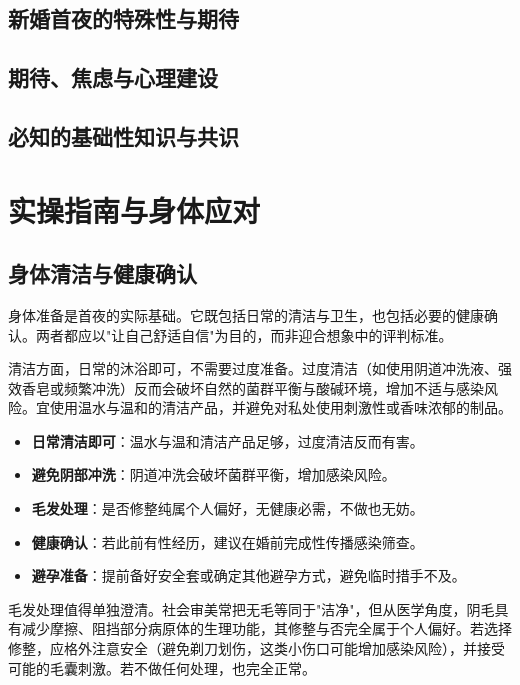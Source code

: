 \documentclass[12pt,UTF8]{ctexbook}
\newcommand{\keyword}[1]{\textbf{#1}}
\begin{document}
\subsection{新婚首夜的特殊性与期待}

\subsection{期待、焦虑与心理建设}

\subsection{必知的基础性知识与共识}




\section{实操指南与身体应对}


\subsection{身体清洁与健康确认}

身体准备是首夜的实际基础。它既包括日常的清洁与卫生，也包括必要的健康确认。两者都应以"让自己舒适自信"为目的，而非迎合想象中的评判标准。

清洁方面，日常的沐浴即可，不需要过度准备。过度清洁（如使用阴道冲洗液、强效香皂或频繁冲洗）反而会破坏自然的菌群平衡与酸碱环境，增加不适与感染风险。宜使用温水与温和的清洁产品，并避免对私处使用刺激性或香味浓郁的制品。

\begin{itemize}
	\item \keyword{日常清洁即可}：温水与温和清洁产品足够，过度清洁反而有害。
	\item \keyword{避免阴部冲洗}：阴道冲洗会破坏菌群平衡，增加感染风险。
	\item \keyword{毛发处理}：是否修整纯属个人偏好，无健康必需，不做也无妨。
	\item \keyword{健康确认}：若此前有性经历，建议在婚前完成性传播感染筛查。
	\item \keyword{避孕准备}：提前备好安全套或确定其他避孕方式，避免临时措手不及。
\end{itemize}

毛发处理值得单独澄清。社会审美常把无毛等同于"洁净"，但从医学角度，阴毛具有减少摩擦、阻挡部分病原体的生理功能，其修整与否完全属于个人偏好。若选择修整，应格外注意安全（避免剃刀划伤，这类小伤口可能增加感染风险），并接受可能的毛囊刺激。若不做任何处理，也完全正常。
\end{document}
